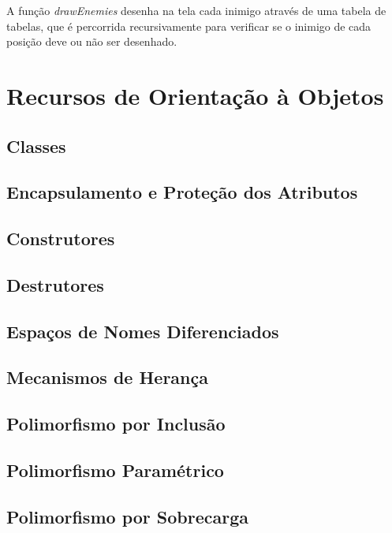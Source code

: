 \documentclass[rel_mlp]{iiufrgs}
\begin{document}
A função \textit{drawEnemies} desenha na tela cada inimigo através de uma tabela de tabelas, que é percorrida recursivamente para verificar se o inimigo de cada posição deve ou não ser desenhado.


\chapter{Recursos de Orientação à Objetos}

\section{Classes}

\section{Encapsulamento e Proteção dos Atributos}

\section{Construtores}

\section{Destrutores}

\section{Espaços de Nomes Diferenciados}

\section{Mecanismos de Herança}

\section{Polimorfismo por Inclusão}

\section{Polimorfismo Paramétrico}

\section{Polimorfismo por Sobrecarga}
\end{document}
